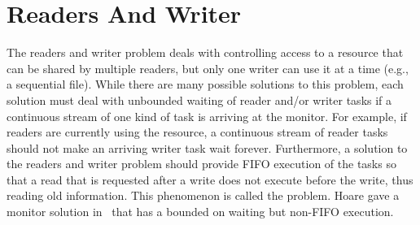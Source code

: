 \documentclass[openright,twoside]{report}
\begin{document}
% 
% 
% 


\section{Readers And Writer}
\label{s:ReadersAndWriter}

The readers and writer problem deals with controlling access to a resource that can be shared by multiple readers, but only one writer can use it at a time (e.g., a sequential file).
While there are many possible solutions to this problem, each solution must deal with unbounded waiting of reader and/or writer tasks if a continuous stream of one kind of task is arriving at the monitor.
For example, if readers are currently using the resource, a continuous stream of reader tasks should not make an arriving writer task wait forever.
Furthermore, a solution to the readers and writer problem should provide FIFO execution of the tasks so that a read that is requested after a write does not execute before the write, thus reading old information.
This phenomenon is called the  problem.
Hoare gave a monitor solution in~\cite{Hoare74} that has a bounded on waiting but non-FIFO execution.
\end{document}
